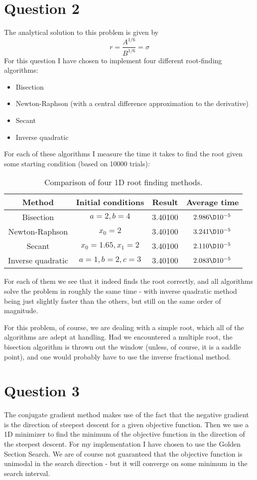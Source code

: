 \documentclass[a4paper,10pt]{article}
\begin{document}
	\section*{Question 2}
	The analytical solution to this problem is given by
	\begin{equation}\label{key}
		r = \frac{A^{1/6}}{B^{1/6}} = \sigma
	\end{equation}
	For this question I have chosen to implement four different root-finding algorithms:
	\begin{itemize}
		\item Bisection
		\item Newton-Raphson (with a central difference approximation to the derivative)
		\item Secant
		\item Inverse quadratic
	\end{itemize}
	For each of these algorithms I measure the time it takes to find the root given some starting condition (based on 10000 trials):
	\begin{table}[H]
		\centering
		\begin{tabular}{c|c|c|c}
			Method & Initial conditions & Result & Average time \\
			\hline
			Bisection & $ a=2, b=4 $ & 3.40100 & $ 2.986\D10^{-5} $ \\
			Newton-Raphson & $ x_0 = 2 $ & 3.40100 & $ 3.241\D10^{-5} $ \\
			Secant & $ x_0 = 1.65, x_1 = 2 $ & 3.40100 & $ 2.110\D10^{-5} $ \\
			Inverse quadratic & $ a=1, b=2, c=3 $ & 3.40100 & $ 2.083\D10^{-5} $
		\end{tabular}
		\caption{Comparison of four 1D root finding methods.}
		\label{tab:roots}
	\end{table}
	For each of them we see that it indeed finds the root correctly, and all algorithms solve the problem in roughly the same time - with inverse quadratic method being just slightly faster than the others, but still on the same order of magnitude. 
	
	For this problem, of course, we are dealing with a simple root, which all of the algorithms are adept at handling. Had we encountered a multiple root, the bisection algorithm is thrown out the window (unless, of course, it is a saddle point), and one would probably have to use the inverse fractional method.
	
	\section*{Question 3}
	The conjugate gradient method makes use of the fact that the negative gradient is the direction of steepest descent for a given objective function. Then we use a 1D minimizer to find the minimum of the objective function in the direction of the steepest descent. For my implementation I have chosen to use the Golden Section Search. We are of course not guaranteed that the objective function is unimodal in the search direction - but it will converge on some minimum in the search interval.
	
\end{document}
